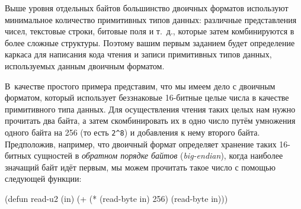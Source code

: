 Выше уровня отдельных байтов большинство двоичных форматов используют минимальное
количество примитивных типов данных: различные представления чисел, текстовые строки,
битовые поля и т.~д., которые затем комбинируются в более сложные структуры. Поэтому
вашим первым заданием будет определение каркаса для написания кода чтения и записи
примитивных типов данных, используемых данным двоичным форматом.

В~качестве простого примера представим, что мы имеем дело с двоичным форматом, который
использует беззнаковые 16-битные целые числа в качестве примитивного типа данных. Для
осуществления чтения таких целых нам нужно прочитать два байта, а затем скомбинировать их
в одно число путём умножения одного байта на 256 (то есть \lstinline!2^8!) и добавления к
нему второго байта. Предположив, например, что двоичный формат определяет хранение таких
16-битных сущностей в \textit{обратном порядке байтов}
(\textit{big-endian}), когда наиболее значащий байт идёт
первым, мы можем прочитать такое число с помощью следующей функции:

\begin{myverb}
(defun read-u2 (in)
  (+ (* (read-byte in) 256) (read-byte in)))
\end{myverb}

